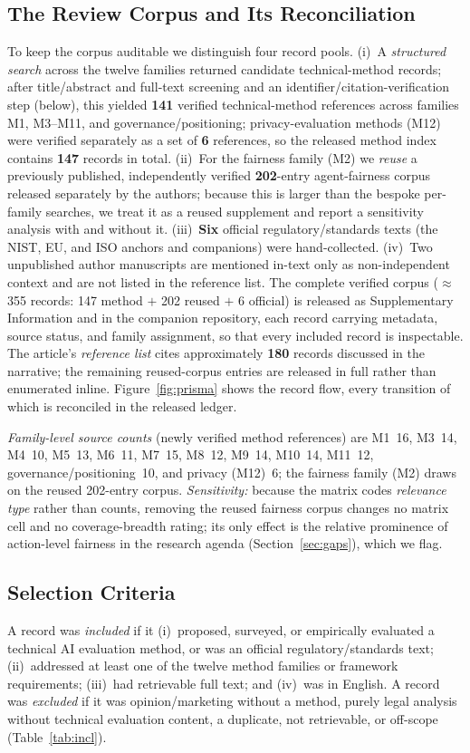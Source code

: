 \subsection{The Review Corpus and Its Reconciliation}
To keep the corpus auditable we distinguish four record pools. (i)~A \emph{structured
search} across the twelve families returned candidate technical-method records; after
title/abstract and full-text screening and an identifier/citation-verification step
(below), this yielded \textbf{141} verified technical-method references across families
M1, M3--M11, and governance/positioning; privacy-evaluation methods (M12) were verified
separately as a set of \textbf{6} references, so the released method index contains
\textbf{147} records in total. (ii)~For the
fairness family (M2) we \emph{reuse} a previously published, independently verified
\textbf{202}-entry agent-fairness corpus released separately by the authors; because this
is larger than the bespoke per-family searches, we treat it as a reused supplement and
report a sensitivity analysis with and without it. (iii)~\textbf{Six} official
regulatory/standards texts (the NIST, EU, and ISO anchors and companions) were
hand-collected. (iv)~Two unpublished author manuscripts are mentioned in-text only as
non-independent context and are not listed in the reference list. The complete verified corpus ($\approx$355 records: 147 method $+$ 202 reused $+$ 6
official) is released as Supplementary
Information and in the companion repository, each record carrying metadata, source status,
and family assignment, so that every included record is inspectable. The article's
\emph{reference list} cites approximately \textbf{180} records discussed in the narrative; the
remaining reused-corpus entries are released in full rather than enumerated inline.
Figure~\ref{fig:prisma} shows the record flow, every transition of which is reconciled in
the released ledger.

\emph{Family-level source counts} (newly verified method references) are M1~16, M3~14,
M4~10, M5~13, M6~11, M7~15, M8~12, M9~14, M10~14, M11~12, governance/positioning~10, and
privacy (M12)~6; the fairness family (M2) draws on the reused 202-entry corpus. \emph{Sensitivity:} because the matrix codes
\emph{relevance type} rather than counts, removing the reused fairness corpus changes no
matrix cell and no coverage-breadth rating; its only effect is the relative prominence of
action-level fairness in the research agenda (Section~\ref{sec:gaps}), which we flag.

\subsection{Selection Criteria}
A record was \emph{included} if it (i)~proposed, surveyed, or empirically evaluated a
technical AI evaluation method, or was an official regulatory/standards text;
(ii)~addressed at least one of the twelve method families or framework requirements;
(iii)~had retrievable full text; and (iv)~was in English. A record was \emph{excluded} if
it was opinion/marketing without a method, purely legal analysis without technical
evaluation content, a duplicate, not retrievable, or off-scope (Table~\ref{tab:incl}).


